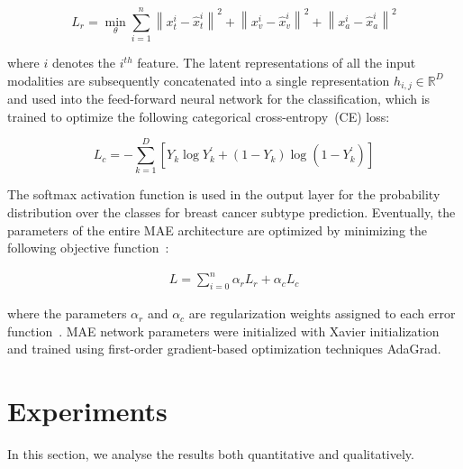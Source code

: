 \vspace{-2mm}
\begin{equation}
   L_{r} = \min _{\theta} \sum_{i=1}^{n} \left\|x_{t}^{i}-\hat{x}_{t}^{i}\right\|^{2}+\left\|x_{v}^{i}-\hat{x}_{v}^{i}\right\|^{2}+\left\|x_{a}^{i}-\hat{x}_{a}^{i}\right\|^{2}
   \label{eq:recons_loss}
\end{equation}

\hspace*{3.5mm} where $i$ denotes the $i^{th}$ feature. The latent representations of all the input modalities are subsequently concatenated into a single representation $h_{i,j} \in \mathbb{R}^{D}$ and used into the feed-forward neural network for the classification, which is trained to optimize the following categorical cross-entropy~(CE) loss: %

\vspace{-2mm}
\begin{equation} 
    L_{c}=-\sum_{k=1}^{D}\left[Y_{k} \log Y_{k}^{\prime}+\left(1-Y_{k}\right) \log \left(1-Y_{k}^{\prime}\right)\right]
    \label{eq:cross_entropy_loss}
\end{equation} 

\hspace*{3.5mm} The softmax activation function is used in the output layer for the probability distribution over the classes for breast cancer subtype prediction. 
Eventually, the parameters of the entire MAE  architecture are optimized by minimizing the following objective function~\cite{mmdcae}:

\vspace{-4mm}
\begin{align}
    {L}=\sum_{i=0}^{n} \alpha_{r} {L}_{r}+\alpha_{c} {L}_{c}
    \label{eq:sum}
\end{align}

\hspace*{3.5mm} where the parameters $\alpha_{r}$ and $\alpha_{c}$ are regularization weights assigned to each error function~\cite{mmdcae}. MAE network parameters were initialized with Xavier initialization~\cite{xavier} and trained using first-order gradient-based optimization techniques AdaGrad. 

\section{Experiments}\label{chapter_4:results}
In this section, we analyse the results both quantitative and qualitatively. 

